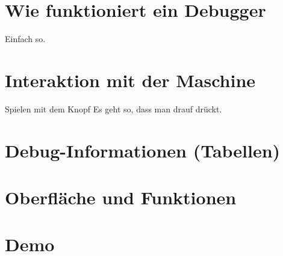 \section{Wie funktioniert ein Debugger}

\begin{frame}{\insertsection}
 Einfach so.
\end{frame}


\section{Interaktion mit der Maschine}

\begin{frame}{Spielen mit dem Knopf}
 Es geht so, dass man drauf drückt.
\end{frame}


\section{Debug-Informationen (Tabellen)}

\section{Oberfläche und Funktionen}

\section{Demo}



